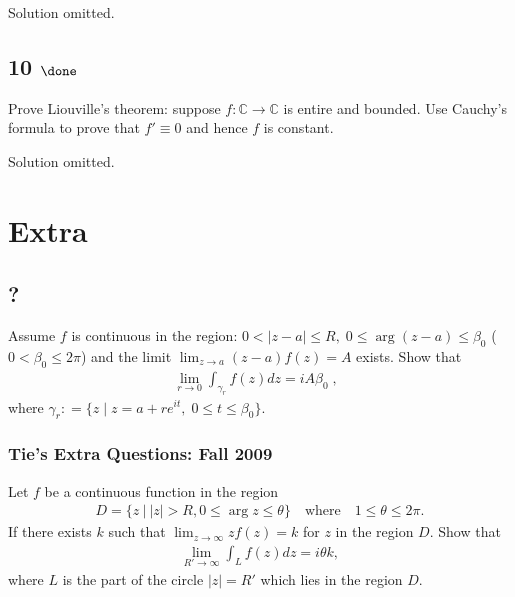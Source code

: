 
Solution omitted.

\hypertarget{done-2}{%
\subsection{\texorpdfstring{10
\(\done\)}{10 \textbackslash done}}\label{done-2}}

Prove Liouville's theorem: suppose \(f:{\mathbb{C}}\to{\mathbb{C}}\) is
entire and bounded. Use Cauchy's formula to prove that \(f'\equiv 0\)
and hence \(f\) is constant.

Solution omitted.

\hypertarget{extra}{%
\section{Extra}\label{extra}}

\hypertarget{section-2}{%
\subsection{?}\label{section-2}}

Assume \(f\) is continuous in the region:
\(0< |z-a| \leq R, \; 0 \leq \arg(z-a) \leq \beta_0\)
(\(0 < \beta_0 \leq 2 \pi\)) and the limit
\(\displaystyle \lim_{z \rightarrow a} (z-a) f(z) = A\) exists. Show
that
\begin{align*}\lim_{r \rightarrow 0} \int_{\gamma_r} f(z) dz  = i A \beta_0 \; , \; \;\end{align*}
where
\(\gamma_r : = \{ z \; | \; z = a + r e^{it}, \; 0 \leq t \leq \beta_0 \}.\)

\hypertarget{ties-extra-questions-fall-2009-1}{%
\subsubsection{Tie's Extra Questions: Fall
2009}\label{ties-extra-questions-fall-2009-1}}

Let \(f\) be a continuous function in the region
\begin{align*}D=\{z {~\mathrel{\Big|}~}{\left\lvert {z} \right\rvert}>R, 0\leq \arg z\leq \theta\}\quad\text{where}\quad
1\leq \theta \leq 2\pi.\end{align*}
If there exists \(k\) such that
\(\displaystyle{\lim_{z\to\infty} zf(z)=k}\) for \(z\) in the region
\(D\). Show that
\begin{align*}\lim_{R'\to\infty} \int_{L} f(z) dz=i\theta k,\end{align*}
where \(L\) is the part of the circle \(|z|=R'\) which lies in the
region \(D\).

